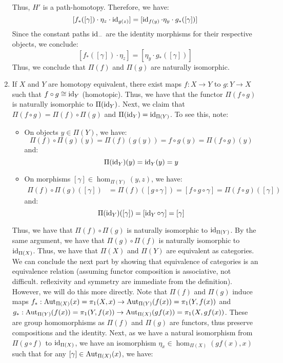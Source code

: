 \documentclass[12pt]{article}
\begin{document}
\begin{solution}
\begin{enumerate}
\begin{itemize}
    \end{itemize}
    Thus, $H'$ is a path-homotopy. Therefore, we have:
    \[ [f_*([\gamma]) \cdot \eta_z \cdot \operatorname{id}_{g(z)}] = [\operatorname{id}_{f(y)} \cdot \eta_y \cdot g_*([\gamma])]\]
    Since the constant paths $\operatorname{id}_{-}$ are the identity morphisms for their respective objects, we conclude:
    \[ [f_*([\gamma]) \cdot \eta_z] = [\eta_y \cdot g_*([\gamma])]\]
    Thus, we conclude that $\Pi(f)$ and $\Pi(g)$ are naturally isomorphic.
    \item If $X$ and $Y$ are homotopy equivalent, there exist maps $f: X \to Y$ to $g: Y \to X$ such that $f \circ g \cong \operatorname{id}_Y$ (homotopic). Thus, we have that the functor $\Pi(f\circ g)$ is naturally isomorphic to $\Pi(\operatorname{id}_Y)$. Next, we claim that $\Pi(f \circ g) = \Pi(f) \circ \Pi(g)$ and $\Pi(\operatorname{id}_Y) = \operatorname{id}_{\Pi(Y)}$. To see this, note:
    \begin{itemize}
        \item On objects $y \in \Pi(Y)$, we have: 
        \[ \Pi(f)\circ \Pi(g)(y) = \Pi(f)(g(y)) = f\circ g(y) = \Pi(f \circ g)(y) \]
        and: 
        \[ \Pi(\operatorname{id}_Y)(y) = \operatorname{id}_Y(y) = y\]
        \item On morphisms $[\gamma] \in \hom_{\Pi(Y)}(y,z)$, we have:
        \begin{align*}
            \Pi(f) \circ \Pi(g)([\gamma]) &= \Pi(f)([g \circ \gamma]) = [f \circ g \circ \gamma] = \Pi(f \circ g)([\gamma])
        \end{align*}
        and: 
        \[ \Pi(\operatorname{id}_Y)([\gamma]) = [\operatorname{id}_Y \circ \gamma] = [\gamma]\]
    \end{itemize}
    Thus, we have that $\Pi(f) \circ \Pi(g)$ is naturally isomorphic to $\operatorname{id}_{\Pi(Y)}$. By the same argument, we have that $\Pi(g) \circ \Pi(f)$ is naturally isomorphic to $\operatorname{id}_{\Pi(X)}$. Thus, we have that $\Pi(X)$ and $\Pi(Y)$ are equivalent as categories. \bbni
    We can conclude the next part by showing that equivalence of categories is an equivalence relation (assuming functor composition is associative, not difficult. reflexivity and symmetry are immediate from the definition). However, we will do this more directly. \bbni
    Note that $\Pi(f)$ and $\Pi(g)$ induce maps $f_*: \operatorname{Aut}_{\Pi(X)}(x) = \pi_1(X, x) \to \operatorname{Aut}_{\Pi(Y)}(f(x)) = \pi_1(Y, f(x))$ and $g_*: \operatorname{Aut}_{\Pi(Y)}(f(x)) = \pi_1(Y, f(x)) \to \operatorname{Aut}_{\Pi(X)}(gf(x)) = \pi_1(X, gf(x))$. These are group homomorphisms as $\Pi(f)$ and $\Pi(g)$ are functors, thus preserve compositions and the identity. \bbni 
    Next, as we have a natural isomorphism from $\Pi(g\circ f)$ to $\operatorname{id}_{\Pi(X)}$, we have an isomorphism $\eta_x \in \hom_{\Pi(X)}(gf(x), x)$ such that for any $[\gamma] \in \operatorname{Aut}_{\Pi(X)}(x)$, we have:

\end{enumerate}
\end{solution}
\end{document}
